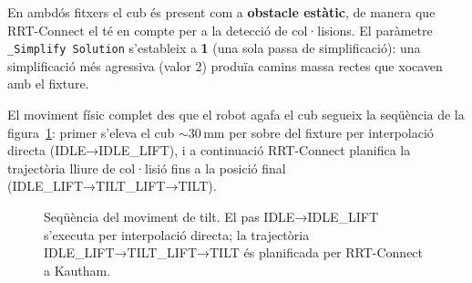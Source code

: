 \documentclass[12pt, a4paper]{article}
\begin{document}
En ambdós fitxers el cub és present com a \textbf{obstacle estàtic}, de manera que RRT-Connect el té en compte per a la detecció de col·lisions. El paràmetre \texttt{\_Simplify Solution} s'estableix a \textbf{1} (una sola passa de simplificació): una simplificació més agressiva (valor 2) produïa camins massa rectes que xocaven amb el fixture.

El moviment físic complet des que el robot agafa el cub segueix la seqüència de la figura~\ref{fig:tilt_configs}: primer s'eleva el cub $\sim$30\,mm per sobre del fixture per interpolació directa (IDLE→IDLE\_LIFT), i a continuació RRT-Connect planifica la trajectòria lliure de col·lisió fins a la posició final (IDLE\_LIFT→TILT\_LIFT→TILT).

\begin{figure}[H]
  \centering
  \caption{Seqüència del moviment de tilt. El pas IDLE→IDLE\_LIFT s'executa per interpolació directa; la trajectòria IDLE\_LIFT→TILT\_LIFT→TILT és planificada per RRT-Connect a Kautham.}
  \label{fig:tilt_configs}
\end{figure}
\end{document}
